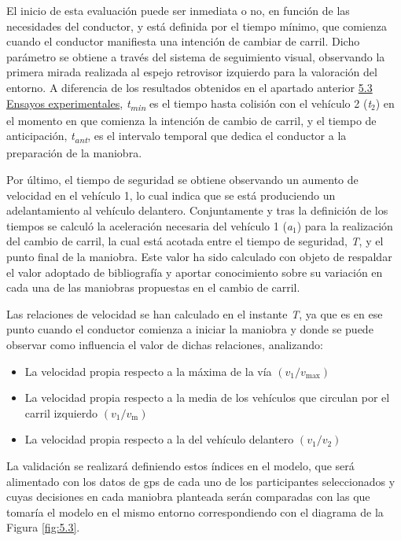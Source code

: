 El inicio de esta evaluación puede ser inmediata o no, en función de las necesidades del conductor, y está definida por el tiempo mínimo, que comienza cuando el conductor manifiesta una intención de cambiar de carril. Dicho parámetro se obtiene a través del sistema de seguimiento visual, observando la primera mirada realizada al espejo retrovisor izquierdo para la valoración del entorno. A diferencia de los resultados obtenidos en el apartado anterior \hyperref[53]{5.3 Ensayos experimentales}, \emph{t\textsubscript{min}} es el tiempo hasta colisión con el vehículo 2 (\emph{t$_2$}) en el momento en que comienza la intención de cambio de carril, y el tiempo de anticipación, \emph{t\textsubscript{ant}}, es el intervalo temporal que dedica el conductor a la preparación de la maniobra. 

Por último, el tiempo de seguridad se obtiene observando un aumento de velocidad en el vehículo 1, lo cual indica que se está produciendo un adelantamiento al vehículo delantero. Conjuntamente y tras la definición de los tiempos se calculó la aceleración necesaria del vehículo 1 (\emph{a$_1$}) para la realización del cambio de carril, la cual está acotada entre el tiempo de seguridad, \emph{T}, y el punto final de la maniobra. Este valor ha sido calculado con objeto de respaldar el valor adoptado de bibliografía y aportar conocimiento sobre su variación en cada una de las maniobras propuestas en el cambio de carril.

Las relaciones de velocidad se han calculado en el instante \emph{T}, ya que es en ese punto cuando el conductor comienza a iniciar la maniobra y donde se puede observar como influencia el valor de dichas relaciones, analizando:

\begin{itemize}
    \item La velocidad propia respecto a la máxima de la vía $(v_1/v_{\text{max}})$
    \item La velocidad propia respecto a la media de los vehículos que circulan por el carril izquierdo $(v_1/v_{\text{m}})$
    \item La velocidad propia respecto a la del vehículo delantero $(v_1/v_2)$  
\end{itemize}

La validación se realizará definiendo estos índices en el modelo, que será alimentado con los datos de \gls{gps} de cada uno de los participantes seleccionados y cuyas decisiones en cada maniobra planteada serán comparadas con las que tomaría el modelo en el mismo entorno correspondiendo con el diagrama de la Figura \ref{fig:5.3}. 

